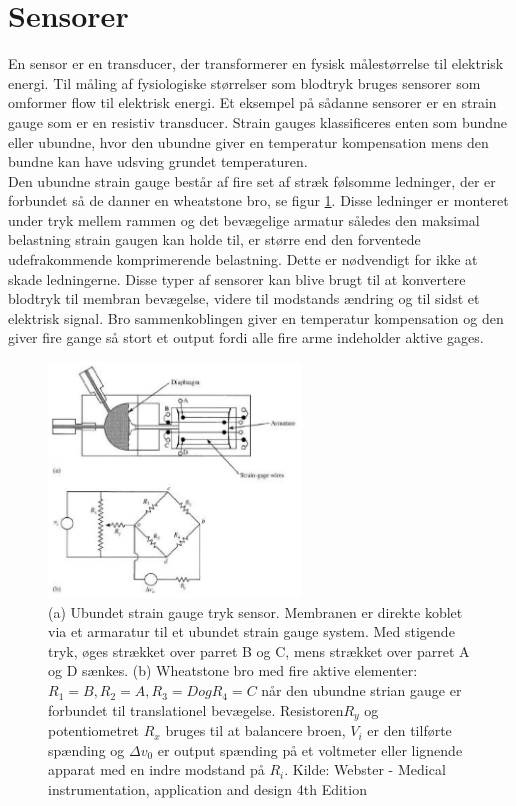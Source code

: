 \section{Sensorer}
En sensor er en transducer, der transformerer en fysisk målestørrelse til elektrisk energi. Til måling af fysiologiske størrelser som blodtryk bruges sensorer som omformer flow til elektrisk energi. Et eksempel på sådanne sensorer er en strain gauge som er en resistiv transducer. Strain gauges klassificeres enten som bundne eller ubundne, hvor den ubundne giver en temperatur kompensation mens den bundne kan have udsving grundet temperaturen.\\
Den ubundne strain gauge består af fire set af stræk følsomme ledninger, der er forbundet så de danner en wheatstone bro, se figur \ref{StrainGauge}. Disse ledninger er monteret under tryk mellem rammen og det bevægelige armatur således den maksimal belastning strain gaugen kan holde til, er større end den forventede udefrakommende komprimerende belastning. Dette er nødvendigt for ikke at skade ledningerne. Disse typer af sensorer kan blive brugt til at konvertere blodtryk til membran bevægelse, videre til modstands ændring og til sidst et elektrisk signal. Bro sammenkoblingen giver en temperatur kompensation og den giver fire gange så stort et output fordi alle fire arme indeholder aktive gages.\\
\begin{figure}[H]
	\centering
	\includegraphics[width=0.6\textwidth]{Figurer/Hardware/straingauge}
	\caption{(a) Ubundet strain gauge tryk sensor. Membranen er direkte koblet via et armaratur til et ubundet strain gauge system. Med stigende tryk, øges strækket over parret B og C, mens strækket over parret A og D sænkes. (b) Wheatstone bro med fire aktive elementer: $R_{1} = B, R_{2} = A, R_{3} = D og R_{4} = C $ når den ubundne strian gauge er forbundet til translationel bevægelse. Resistoren$ R_{y}$ og potentiometret $R_{x}$ bruges til at balancere broen, $V_{i}$ er den tilførte spænding og $\Delta v_{0}$ er output spænding på et voltmeter eller lignende apparat med en indre modstand på $R_{i}$. Kilde: Webster - Medical instrumentation, application and design 4th Edition}
	\label{StrainGauge}
\end{figure}






